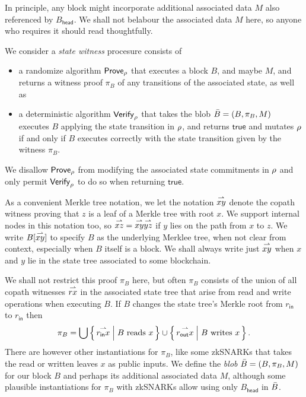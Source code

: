 In principle, any block might incorporate additional associated data $M$ also referenced by $B_{\mathsf{head}}$.  We shall not belabour the associated data $M$ here, so anyone who requires it should read thoughtfully.

\begin{definition}\label{def:pob}
We consider a {\em state witness} procesure consists of  
\begin{itemize}
\item a randomize algorithm $\mathsf{Prove}_{\rho}$ that executes a block $B$, and maybe $M$, and returns a witness proof $\pi_B$ of any transitions of the associated state, as well as 
\item a deterministic algorithm $\mathsf{Verify}_{\rho}$ that takes the blob $\bar{B} = (B,\pi_B,M)$ executes $B$ applying the state transition in $\rho$, and returns $\mathsf{true}$ and mutates $\rho$ if and only if $B$ executes correctly with the state transition given by the witness $\pi_B$.  
\end{itemize}
\end{definition}
We disallow $\mathsf{Prove}_{\rho}$ from modifying the associated state commitments in $\rho$ and only permit $\mathsf{Verify}_{\rho}$ to do so when returning $\mathsf{true}$.

As a convenient Merkle tree notation, we let the notation $\overset{\rightharpoonup}{xy}$ denote the copath witness proving that $z$ is a leaf of a Merkle tree with root $x$.  We support internal nodes in this notation too, so $\overset{\rightharpoonup}{xz} = \overset{\rightharpoonup}{xy} \overset{\rightharpoonup}{yz}$ if $y$ lies on the path from $x$ to $z$.  We write $B[\overset{\rightharpoonup}{xy}]$ to specify $B$ as the underlying Merklee tree, when not clear from context, especially when $B$ itself is a block.  We shall always write just $\overset{\rightharpoonup}{xy}$ when $x$ and $y$ lie in the state tree associated to some blockchain.  

We shall not restrict this proof $\pi_B$ here, but often $\pi_B$ consists of the union of all copath witnesses $\overset{\rightharpoonup}{rx}$ in the associated state tree that arise from read and write operations when executing $B$.  If $B$ changes the state tree's Merkle root from $r_{\mathsf{in}}$ to $r_{\mathsf{in}}$ then 
$$
\pi_B = 
  \bigcup \Setst{ \vect{r_{\mathsf{in}}x} }{ \textrm{$B$ reads $x$} }
  \cup \Setst{ \vect{r_{\mathsf{out}}x} }{ \textrm{$B$ writes $x$} } \mathperiod
$$
There are however other instantiations for $\pi_B$, like some zkSNARKs that takes the read or written leaves $x$ as public inputs.  We define the {\em blob} $\bar{B} = (B, \pi_B, M)$ for our block $B$ and perhaps its additional associated data $M$, although some plausible instantiations for $\pi_B$ with zkSNARKs allow using only $B_{\mathsf{head}}$ in $\bar{B}$.

